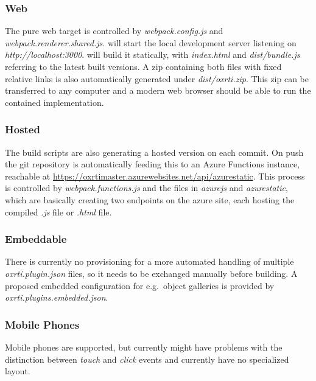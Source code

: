 \subsubsection{Web}
The pure web target is controlled by \emph{webpack.config.js} and
\emph{webpack.renderer.shared.js}.  will start the local
development server listening on \emph{http://localhost:3000}. 
will build it statically, with \emph{index.html} and \emph{dist/bundle.js}
referring to the latest built versions. A zip containing both files with fixed
relative links is also automatically generated under \emph{dist/oxrti.zip}. This
zip can be transferred to any computer and a modern web browser should be able
to run the contained implementation.

\subsubsection{Hosted}
The build scripts are also generating a hosted version on each commit. On push
the git repository\cite*{goslar_oxrti:_2018} is automatically feeding this to an
Azure Functions instance, reachable at
\url{https://oxrtimaster.azurewebsites.net/api/azurestatic}. This process is
controlled by \emph{webpack.functions.js} and the files in \emph{azurejs} and
\emph{azurestatic}, which are basically creating two endpoints on the azure
site, each hosting the compiled \emph{.js} file or \emph{.html} file.

\subsubsection{Embeddable}
There is currently no provisioning for a more automated handling of multiple
\emph{oxrti.plugin.json} files, so it needs to be exchanged manually before
building. A proposed embedded configuration for e.g.\ object galleries is provided by
\emph{oxrti.plugins.embedded.json}.

\subsubsection{Mobile Phones}
Mobile phones are supported, but currently might have
problems with the distinction between \emph{touch} and \emph{click} events and
currently have no specialized layout.

